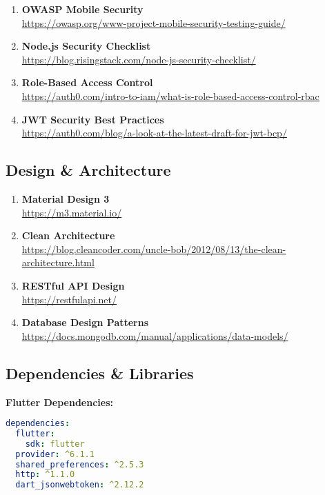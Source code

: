 \documentclass[12pt,a4paper]{article}
\begin{document}
\begin{enumerate}
    \item \textbf{OWASP Mobile Security} \\
          \url{https://owasp.org/www-project-mobile-security-testing-guide/}
    \item \textbf{Node.js Security Checklist} \\
          \url{https://blog.risingstack.com/node-js-security-checklist/}
    \item \textbf{Role-Based Access Control} \\
          \url{https://auth0.com/intro-to-iam/what-is-role-based-access-control-rbac}
    \item \textbf{JWT Security Best Practices} \\
          \url{https://auth0.com/blog/a-look-at-the-latest-draft-for-jwt-bcp/}
\end{enumerate}

\subsection{Design \& Architecture}

\begin{enumerate}
    \item \textbf{Material Design 3} \\
          \url{https://m3.material.io/}
    \item \textbf{Clean Architecture} \\
          \url{https://blog.cleancoder.com/uncle-bob/2012/08/13/the-clean-architecture.html}
    \item \textbf{RESTful API Design} \\
          \url{https://restfulapi.net/}
    \item \textbf{Database Design Patterns} \\
          \url{https://docs.mongodb.com/manual/applications/data-models/}
\end{enumerate}

\subsection{Dependencies \& Libraries}

\textbf{Flutter Dependencies:}
\begin{lstlisting}[language=yaml]
dependencies:
  flutter:
    sdk: flutter
  provider: ^6.1.1
  shared_preferences: ^2.5.3
  http: ^1.1.0
  dart_jsonwebtoken: ^2.12.2
\end{lstlisting}
\end{document}

